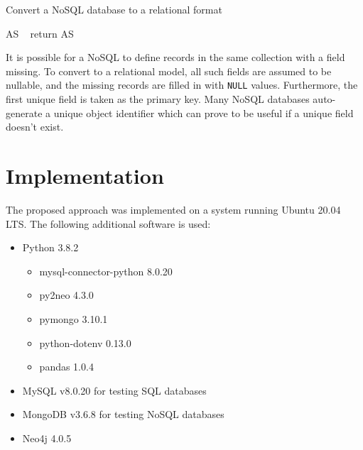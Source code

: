 \documentclass[12pt]{article}
\newcommand{\sectionfontstyle}{\fontsize{16pt}{1em}\usefont{T1}{phv}{b}{n}}
\begin{document}
    \begin{algorithm}[htb!]
        \SetAlgoLined
        \caption{Convert a NoSQL database to a relational format}
        AS \gets\ \phi{}
        return AS\;
        \label{algo:nosql_conversion}
    \end{algorithm}

    It is possible for a NoSQL to define records in the same collection with a field missing. To convert to a relational model, all such fields are assumed to be nullable, and the missing records are filled in with \verb|NULL| values. Furthermore, the first unique field is taken as the primary key. Many NoSQL databases auto-generate a unique object identifier which can prove to be useful if a unique field doesn't exist.

    \clearpage

    \section{\sectionfontstyle Implementation}
    \label{sec:impl}
    The proposed approach was implemented on a system running Ubuntu 20.04 LTS. The following additional software is used:
    \begin{itemize}
        \item Python 3.8.2
        \begin{itemize}
            \item mysql-connector-python 8.0.20
            \item py2neo 4.3.0
            \item pymongo 3.10.1
            \item python-dotenv 0.13.0
            \item pandas 1.0.4
        \end{itemize}
        \item MySQL v8.0.20 for testing SQL databases
        \item MongoDB v3.6.8 for testing NoSQL databases
        \item Neo4j 4.0.5
    \end{itemize}
\end{document}
